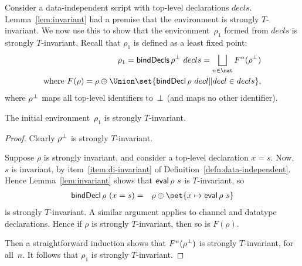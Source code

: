 

Consider a data-independent script with top-level declarations $decls$.
Lemma~\ref{lem:invariant} had a premise that the environment is strongly
$T$-invariant.  We now use this to show that the environment~$\rho_1$ formed
from $decls$ is strongly $T$-invariant.  Recall that $\rho_1$ is defined as a
least fixed point:
\[
\begin{align}
\rho_1 =  \bindDecls \rho^\bottom~decls = \bigsqcup_{n \in \nat} F^n(\rho^\bottom) \\
\mbox{where } F(\rho)  =  
    \rho \oplus \Union \set{\bindDecl \rho ~ decl \| decl \in decls},
\end{align}
\]
where $\rho^\perp$ maps all top-level identifiers to~$\perp$ (and maps no
other identifier).




\begin{prop}
\label{prop:initial-env-invariant}
The initial environment~$\rho_1$ is strongly $T$-invariant.
\end{prop}

\begin{proof}
Clearly $\rho^\perp$ is strongly $T$-invariant.  

Suppose $\rho$ is strongly invariant, and consider a top-level declaration $x
= s$.  Now,  $s$ is invariant, by item~\ref{item:di-invariant} of
Definition~\ref{defn:data-independent}.  Hence Lemma~\ref{lem:invariant} shows
that $\mathop{\sf eval} \rho~s$ is $T$-invariant, so
\begin{eqnarray*}
\bindDecl \rho~(x = s) & = & \rho \oplus \set{x \mapsto \eval \rho~s}
\end{eqnarray*}
is strongly $T$-invariant.  A similar argument applies to channel and datatype
declarations.  Hence if $\rho$ is strongly $T$-invariant, then so is $F(\rho)$.

Then a straightforward induction shows that $F^n(\rho^\perp)$ is strongly
$T$-invariant, for all~$n$.  It follows that $\rho_1$ is strongly
$T$-invariant.
\end{proof}

